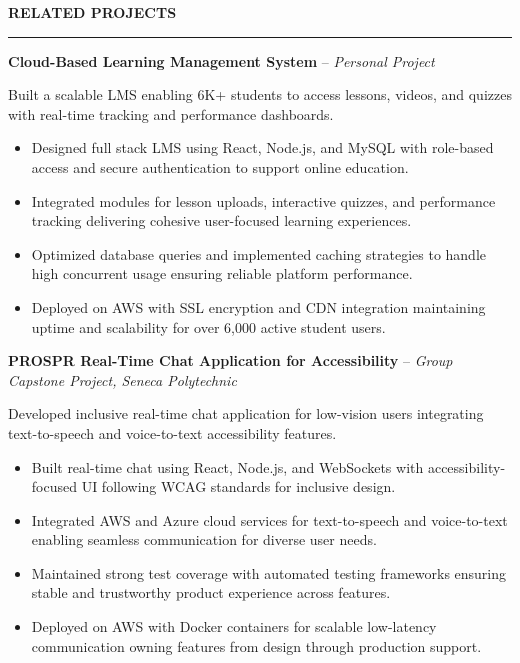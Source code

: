 \documentclass[10pt,letterpaper]{article}
\begin{document}
\vspace{6pt}

\textbf{RELATED PROJECTS}\\[-8pt]
\noindent\rule{\textwidth}{1pt}

\vspace{-2pt}

\textbf{Cloud-Based Learning Management System} -- \emph{Personal Project}

\vspace{-1pt}

Built a scalable LMS enabling 6K+ students to access lessons, videos, and quizzes with real-time tracking and performance dashboards.
\vspace{-1pt}
\begin{itemize}
\item Designed full stack LMS using React, Node.js, and MySQL with role-based access and secure authentication to support online education.
\item Integrated modules for lesson uploads, interactive quizzes, and performance tracking delivering cohesive user-focused learning experiences.
\item Optimized database queries and implemented caching strategies to handle high concurrent usage ensuring reliable platform performance.
\item Deployed on AWS with SSL encryption and CDN integration maintaining uptime and scalability for over 6,000 active student users.
\end{itemize}

\textbf{PROSPR  Real-Time Chat Application for Accessibility} -- \emph{Group Capstone Project, Seneca Polytechnic}

\vspace{-1pt}

Developed inclusive real-time chat application for low-vision users integrating text-to-speech and voice-to-text accessibility features.
\vspace{-1pt}
\begin{itemize}
\item Built real-time chat using React, Node.js, and WebSockets with accessibility-focused UI following WCAG standards for inclusive design.
\item Integrated AWS and Azure cloud services for text-to-speech and voice-to-text enabling seamless communication for diverse user needs.
\item Maintained strong test coverage with automated testing frameworks ensuring stable and trustworthy product experience across features.
\item Deployed on AWS with Docker containers for scalable low-latency communication owning features from design through production support.
\end{itemize}
\end{document}
